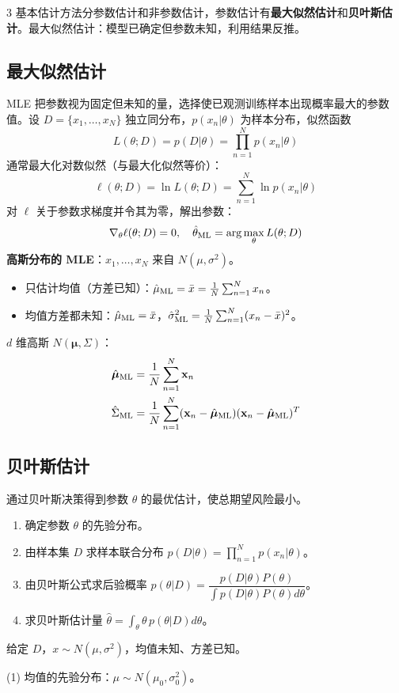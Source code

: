 \documentclass[6pt,a4paper]{extarticle}
\newcommand{\key}[1]{\textbf{#1}}
\begin{document}
\begin{multicols}{3}
基本估计方法分参数估计和非参数估计，参数估计有\key{最大似然估计}和\key{贝叶斯估计}。最大似然估计：模型已确定但参数未知，利用结果反推。

\subsection{最大似然估计}
MLE 把参数视为固定但未知的量，选择使已观测训练样本出现概率最大的参数值。设 $D=\{x_1,\ldots,x_N\}$ 独立同分布，$p(x_n|\theta)$ 为样本分布，似然函数
$$L(\theta;D)=p(D|\theta)=\prod_{n=1}^{N}p(x_n|\theta)$$
通常最大化对数似然（与最大化似然等价）：
$$\ell(\theta;D)=\ln L(\theta;D)=\sum_{n=1}^{N}\ln p(x_n|\theta)$$
对 $\ell$ 关于参数求梯度并令其为零，解出参数：
$$\nabla_\theta\ell(\theta;D)=0,\quad \hat\theta_{\rm ML}=\arg\max_\theta L(\theta;D)$$
\textbf{高斯分布的 MLE}：$x_1,\ldots,x_N$ 来自 $N(\mu,\sigma^2)$。
\begin{itemize}
\item 只估计均值（方差已知）：$\hat\mu_{\rm ML}=\bar x=\frac1N\sum_{n=1}^Nx_n$。
\item 均值方差都未知：$\hat\mu_{\rm ML}=\bar x$，$\hat\sigma^2_{\rm ML}=\frac1N\sum_{n=1}^N(x_n-\bar x)^2$。
\end{itemize}
$d$ 维高斯 $N(\bm\mu,\Sigma)$：
$$\begin{aligned}\hat{\bm\mu}_{\rm ML}&=\frac1N\sum_{n=1}^N\mathbf{x}_n\\ \hat\Sigma_{\rm ML}&=\frac1N\sum_{n=1}^N(\mathbf{x}_n-\hat{\bm\mu}_{\rm ML})(\mathbf{x}_n-\hat{\bm\mu}_{\rm ML})^T\end{aligned}$$

\subsection{贝叶斯估计}
通过贝叶斯决策得到参数 $\theta$ 的最优估计，使总期望风险最小。
\begin{enumerate}
\item 确定参数 $\theta$ 的先验分布。
\item 由样本集 $D$ 求样本联合分布 $p(D|\theta)=\prod_{n=1}^Np(x_n|\theta)$。
\item 由贝叶斯公式求后验概率 $p(\theta|D)=\dfrac{p(D|\theta)P(\theta)}{\int p(D|\theta)P(\theta)d\theta}$。
\item 求贝叶斯估计量 $\hat\theta=\int_\theta\theta\,p(\theta|D)d\theta$。
\end{enumerate}
给定 $D$，$x\sim N(\mu,\sigma^2)$，均值未知、方差已知。

(1) 均值的先验分布：$\mu\sim N(\mu_0,\sigma_0^2)$。


\end{multicols}
\end{document}
